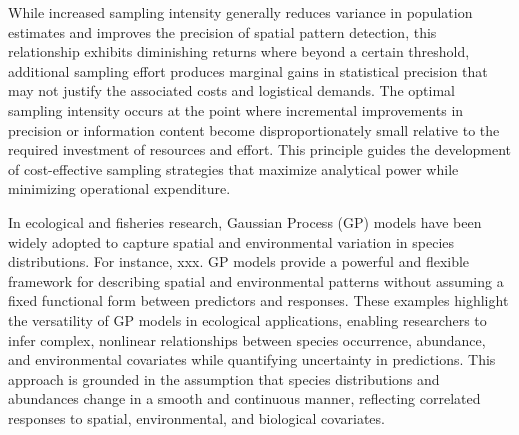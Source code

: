 \documentclass{article}
\begin{document}
While increased sampling intensity generally reduces variance in population estimates and improves the precision of spatial pattern detection, this relationship exhibits diminishing returns where beyond a certain threshold, additional sampling effort produces marginal gains in statistical precision that may not justify the associated costs and logistical demands. The optimal sampling intensity occurs at the point where incremental improvements in precision or information content become disproportionately small relative to the required investment of resources and effort. This principle guides the development of cost-effective sampling strategies that maximize analytical power while minimizing operational expenditure.

In ecological and fisheries research, Gaussian Process (GP) models have been widely adopted to capture spatial and environmental variation in species distributions. For instance, xxx. GP models provide a powerful and flexible framework for describing spatial and environmental patterns without assuming a fixed functional form between predictors and responses. These examples highlight the versatility of GP models in ecological applications, enabling researchers to infer complex, nonlinear relationships between species occurrence, abundance, and environmental covariates while quantifying uncertainty in predictions. This approach is grounded in the assumption that species distributions and abundances change in a smooth and continuous manner, reflecting correlated responses to spatial, environmental, and biological covariates.
\end{document}
